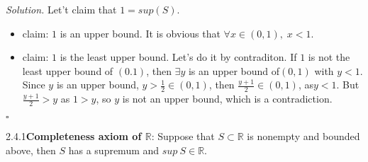 \documentclass[a4paper]{article}
\def\rr{{\mathbb R}}
\newenvironment{solution}{\emph{Solution.}}{\hfill$\square$}
\begin{document}
\begin{solution}
    Let't claim that $1=sup(S)$.
    \begin{itemize}
        \item claim: $1$ is an upper bound. It is obvious that $\forall x \in (0,1), \; x<1$.
        \item claim: $1$ is the least upper bound. Let's do it by contraditon.
         If $1$ is not the least upper bound of $(0.1)$, then $\exists y$ is an upper bound of$(0,1)$ with $y<1$. 
         Since $y$ is an upper bound, $y>\frac{1}{2} \in (0,1)$, then $\frac{y+1}{2} \in (0,1)$, as$y<1$. But $\frac{y+1}{2} > y$ as $1>y$, so $y$ is not an upper bound, which is a contradiction.  
    \end{itemize}
\end{solution}
\begin{theorem}{2.4.1}{}\textbf{Completeness axiom of $\rr$}:
    Suppose that $S\subset \mathbb{R}$ is nonempty and bounded above, then $S$ has a supremum and $sup\:S\in \mathbb{R}$.
\end{theorem}
\end{document}
